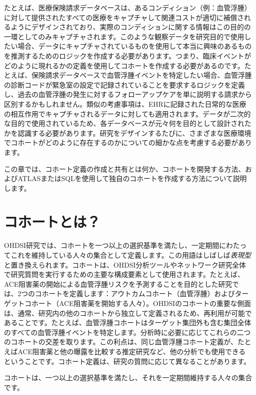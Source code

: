\documentclass[
  11pt]{book}
\makeatletter
\newenvironment{kframe}{%
\medskip{}
\setlength{\fboxsep}{.8em}
 \def\at@end@of@kframe{}%
 \ifinner\ifhmode%
  \def\at@end@of@kframe{\end{minipage}}%
  \begin{minipage}{\columnwidth}%
 \fi\fi%
 \def\FrameCommand##1{\hskip\@totalleftmargin \hskip-\fboxsep
 \colorbox{myShadeColor}{##1}\hskip-\fboxsep
     \hskip-\linewidth \hskip-\@totalleftmargin \hskip\columnwidth}%
 \MakeFramed {\advance\hsize-\width
   \@totalleftmargin\z@ \linewidth\hsize
   \@setminipage}}%
 {\par\unskip\endMakeFramed%
 \at@end@of@kframe}
\newenvironment{rmdblock}[1]
  {
  \begin{itemize}
  \renewcommand{\labelitemi}{
    \raisebox{-.7\height}[0pt][0pt]{
      {\setkeys{Gin}{width=3em,keepaspectratio}\texttt{[image: images/\#1]}}
    }
  }
  \setlength{\fboxsep}{1em}
  \begin{kframe}
  \item
  }
  {
  \end{kframe}
  \end{itemize}
  }
\newenvironment{rmdimportant}
  {\begin{rmdblock}{important}}
  {\end{rmdblock}}
\theoremstyle{definition}
\theoremstyle{definition}
\theoremstyle{definition}
\theoremstyle{definition}
\theoremstyle{remark}
\makeatother
\begin{document}
たとえば、医療保険請求データベースは、あるコンディション（例：血管浮腫）に対して提供されたすべての医療をキャプチャして関連コストが適切に補償されるようにデザインされており、実際のコンディションに関する情報はこの目的の一環としてのみキャプチャされます。このような観察データを研究目的で使用したい場合、データにキャプチャされているものを使用して本当に興味のあるものを推測するためのロジックを作成する必要があります。つまり、臨床イベントがどのように現れるかの定義を使用してコホートを作成する必要があるのです。たとえば、保険請求データベースで血管浮腫イベントを特定したい場合、血管浮腫の診断コードが緊急室の設定で記録されていることを要求するロジックを定義し、過去の血管浮腫の発生に対するフォローアップケアを単に説明する請求から区別するかもしれません。類似の考慮事項は、EHRに記録された日常的な医療の相互作用でキャプチャされるデータに対しても適用されます。データが二次的な目的で使用されているため、各データベースが元々何を目的として設計されたかを認識する必要があります。研究をデザインするたびに、さまざまな医療環境でコホートがどのように存在するのかについての細かな点を考慮する必要があります。

この章では、コホート定義の作成と共有とは何か、コホートを開発する方法、およびATLASまたはSQLを使用して独自のコホートを作成する方法について説明します。

\section{コホートとは？}\label{ux30b3ux30dbux30fcux30c8ux3068ux306f}

OHDSI研究では、コホートを一つ以上の選択基準を満たし、一定期間にわたってこれを維持している人々の集合として定義します。この用語はしばしば\emph{表現型}と置き換えられます。コホートは、OHDSI分析ツールやネットワーク研究全体で研究質問を実行するための主要な構成要素として使用されます。たとえば、ACE阻害薬の開始による血管浮腫リスクを予測することを目的とした研究では、2つのコホートを定義します：アウトカムコホート（血管浮腫）およびターゲットコホート（ACE阻害薬を開始する人々）。OHDSIのコホートの重要な側面は、通常、研究内の他のコホートから独立して定義されるため、再利用が可能であることです。たとえば、血管浮腫コホートはターゲット集団外も含む集団全体のすべての血管浮腫イベントを特定します。分析時に必要に応じてこれらの二つのコホートの交差を取ります。この利点は、同じ血管浮腫コホート定義が、たとえばACE阻害薬と他の曝露を比較する推定研究など、他の分析でも使用できるということです。コホート定義は、研究の質問に応じて異なることがあります。

\begin{rmdimportant}
コホートは、一つ以上の選択基準を満たし、それを一定期間維持する人々の集合です。
\end{rmdimportant}
\end{document}
